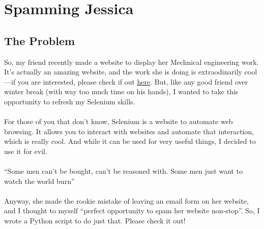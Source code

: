 \section{Spamming Jessica}
\subsection{The Problem}
So, my friend recently made a website to display her Mechnical engineering work. It's actually an amazing website, and the work she is doing is extraodinarily cool---if you are interested, please check if out \href{https://jessicabolar.com/}{here}. But, like any good friend over winter break (with way too much time on his hands), I wanted to take this opportunity to refresh my Selenium skills. \\
\\
For those of you that don't know, Selenium is a website to automate web browsing. It allows you to interact with websites and automate that interaction, which is really cool. And while it can be used for very useful things, I decided to use it for evil. \\
\\
``Some men can't be bought, can't be reasoned with. Some men just want to watch the world burn''\\
\\
Anyway, she made the rookie mistake of leaving an email form on her website, and I thought to myself ``perfect opportunity to spam her website non-stop''. So, I wrote a Python script to do just that. Please check it out!

